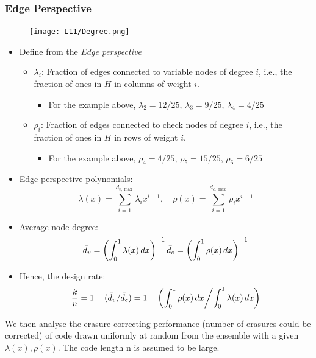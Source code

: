 \documentclass[12pt]{article}
\begin{document}
\subsubsection{Edge Perspective}
\begin{figure}[H]
    \centering
    \texttt{[image: L11/Degree.png]}
\end{figure}
\begin{itemize}
\item Define from the \textit{Edge perspective}
\begin{itemize}
    \item $\lambda_i$: Fraction of edges connected to variable nodes of degree $i$, i.e., the fraction of ones in $H$ in columns of weight $i$.
    \begin{itemize}
        \item For the example above, $\lambda_2=12/25$, $\lambda_3 = 9/25$, $\lambda_4 = 4/25$
    \end{itemize}
    \item $\rho_i$: Fraction of edges connected to check nodes of degree $i$, i.e., the fraction of ones in $H$ in rows of weight $i$.
    \begin{itemize}
        \item For the example above, $\rho_4 = 4/25$, $\rho_5=15/25$, $\rho_6 = 6/25$
    \end{itemize}
    
\end{itemize}
\item Edge-perspective polynomials:
    \[
    \lambda(x) = \sum_{i=1}^{d_{v,\max}} \lambda_i x^{i-1}, \quad \rho(x) = \sum_{i=1}^{d_{c,\max}} \rho_i x^{i-1}
    \]
\item Average node degree:
\[
\Bar{d}_v=\left( \int_0^1 \lambda(x) \, dx \right)^{-1}           \Bar{d}_c=\left( \int_0^1 \rho(x) \, dx \right)^{-1}
\]
\item Hence, the design rate:
\[
\frac{k}{n} = 1 - (\Bar{d}_v / \Bar{d}_c) = 1- \left(\int_0^1 \rho(x) \, dx \middle/ \int_0^1 \lambda(x) \, dx \right)
\]
\end{itemize}
We then analyse the erasure-correcting performance (number of erasures could be corrected) of code drawn uniformly at random from the ensemble with a given $\lambda(x),\rho(x)$. The code length n is assumed to be large.
\end{document}
